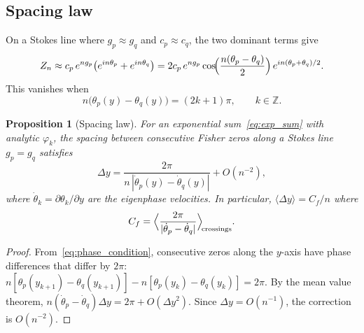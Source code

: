\documentclass[12pt]{article}
\newtheorem{proposition}[theorem]{Proposition}
\theoremstyle{definition}
\theoremstyle{remark}
\newcommand{\avg}[1]{\langle #1 \rangle}
\begin{document}
\subsection{Spacing law}

On a Stokes line where $g_p \approx g_q$ and $c_p \approx c_q$,
the two dominant terms give
\[
Z_n \approx c_p\,e^{n g_p}\bigl(e^{in\theta_p} + e^{in\theta_q}\bigr)
= 2c_p\,e^{ng_p}\cos\!\Bigl(\frac{n(\theta_p - \theta_q)}{2}\Bigr)\,
e^{in(\theta_p+\theta_q)/2}.
\]
This vanishes when
\begin{equation}\label{eq:phase_condition}
n\bigl(\theta_p(y) - \theta_q(y)\bigr) = (2k+1)\pi,
\qquad k \in \mathbb{Z}.
\end{equation}

\begin{proposition}[Spacing law]\label{prop:spacing}
For an exponential sum~\eqref{eq:exp_sum} with analytic $\varphi_k$,
the spacing between consecutive Fisher zeros along a Stokes line
$g_p = g_q$ satisfies
\begin{equation}\label{eq:spacing_law}
\Delta y = \frac{2\pi}{n\,|\dot\theta_p(y) - \dot\theta_q(y)|}
+ O(n^{-2}),
\end{equation}
where $\dot\theta_k = \partial\theta_k/\partial y$ are the eigenphase
velocities.  In particular, $\avg{\Delta y} = C_f/n$ where
\begin{equation}\label{eq:Cf}
C_f = \Bigl\langle
\frac{2\pi}{|\dot\theta_p - \dot\theta_q|}
\Bigr\rangle_{\!\text{crossings}}.
\end{equation}
\end{proposition}

\begin{proof}
From~\eqref{eq:phase_condition}, consecutive zeros along the $y$-axis
have phase differences that differ by $2\pi$:
$n[\theta_p(y_{k+1}) - \theta_q(y_{k+1})] -
n[\theta_p(y_k) - \theta_q(y_k)] = 2\pi$.
By the mean value theorem,
$n(\dot\theta_p - \dot\theta_q)\Delta y = 2\pi + O(\Delta y^2)$.
Since $\Delta y = O(n^{-1})$, the correction is $O(n^{-2})$.
\end{proof}
\end{document}
